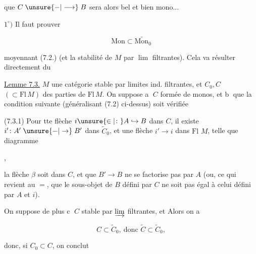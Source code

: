 

que $C\mathrel{\unsure{-|\longrightarrow}}B$ sera alors bel et bien mono...

$1^\circ)$ Il faut prouver

\[
\mathrm{Mon}\subset\widetilde{\mathrm{Mon}_0}
\]

moyennant (7.2.) (et la stabilité de $M$ par \uline{$\lim$} filtrantes). Cela va résulter directement du

\uline{Lemme 7.3.}  $M$ une catégorie stable par limites ind. filtrantes, et $C_0,C$ $(\subset\mathrm{Fl}\,M)$ des parties de $\mathrm{Fl}\,M$. On suppose \textcircled{a} $C$ formée de monos, et \textcircled{b} que la condition suivante (généralisant (7.2) ci-dessus) soit vérifiée

(7.3.1) Pour tte flèche $i\unsure{\in|\colon} A\hookrightarrow B$ dans $C$,  il existe $i'\colon A'\mathrel{\unsure{-|\to}}B'$ dans $\widetilde C_0$, et une flèche $i'\longrightarrow i$ dans \uline{$\mathrm{Fl}$} $M$, telle que   diagramme

\hfill,

la flèche $\beta$ soit dans $C$, et que $B'\longrightarrow B$ ne se factorise pas par $A$ (ou, ce qui revient au $=$, que le sous-objet de $B$ défini par $C$ ne soit pas égal à celui défini par $A$ et $i$).

On suppose de plus \textcircled{c} $C$ stable par $\varinjlim$ filtrantes, et
 Alors on a

\[
C\subset\widetilde C_0,\ \text{donc }\widetilde C\subset\widetilde C_0,\tag*{(7.3.2)}
\]

donc, si $C_0\subset C$, on conclut
